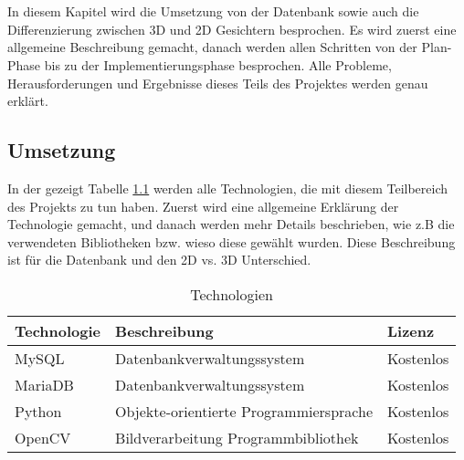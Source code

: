 \chapter{\docname}
In diesem Kapitel wird die Umsetzung von der Datenbank sowie auch die Differenzierung zwischen 3D und 2D Gesichtern besprochen. Es wird zuerst eine allgemeine Beschreibung gemacht, danach werden allen Schritten von der Plan-Phase bis zu der Implementierungsphase besprochen. Alle Probleme, Herausforderungen und Ergebnisse dieses Teils des Projektes werden genau erklärt.
\section{Umsetzung}
In der gezeigt Tabelle \ref{table:tech} werden alle Technologien, die mit diesem Teilbereich des Projekts  zu tun haben. Zuerst wird eine allgemeine Erklärung der Technologie gemacht, und danach werden mehr Details beschrieben, wie z.B die verwendeten Bibliotheken bzw. wieso diese gewählt wurden. Diese Beschreibung ist für die Datenbank und den 2D vs. 3D Unterschied.

\begin{table}[ht]
	\centering
	\begin{tabular}{ |l|l|l| } 
		\hline		
		Technologie & Beschreibung & Lizenz \\ 
		\hline
		MySQL & Datenbankverwaltungssystem & Kostenlos \\ 
		\hline
		MariaDB & Datenbankverwaltungssystem & Kostenlos \\
		\hline 
		Python & Objekte-orientierte Programmiersprache & Kostenlos \\
		\hline 
		OpenCV &  Bildverarbeitung Programmbibliothek  & Kostenlos \\ 
		\hline
	\end{tabular}
	\caption{Technologien}
	\label{table:tech}
\end{table}
